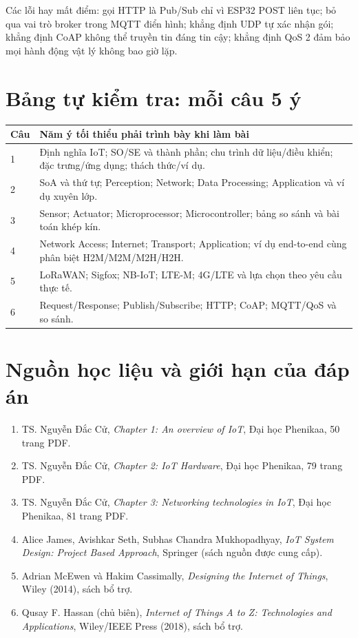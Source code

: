 \documentclass[12pt,a4paper]{article}
\begin{document}
\begin{luuy}
Các lỗi hay mất điểm: gọi HTTP là Pub/Sub chỉ vì ESP32 POST liên tục; bỏ qua vai trò broker trong MQTT điển hình; khẳng định UDP tự xác nhận gói; khẳng định CoAP không thể truyền tin đáng tin cậy; khẳng định QoS 2 đảm bảo mọi hành động vật lý không bao giờ lặp.
\end{luuy}

\newpage
\section*{Bảng tự kiểm tra: mỗi câu 5 ý}
\begin{longtable}{p{1.4cm}p{13.2cm}}
\toprule
Câu & Năm ý tối thiểu phải trình bày khi làm bài\\
\midrule\endhead
1 & Định nghĩa IoT; SO/SE và thành phần; chu trình dữ liệu/điều khiển; đặc trưng/ứng dụng; thách thức/ví dụ.\\
2 & SoA và thứ tự; Perception; Network; Data Processing; Application và ví dụ xuyên lớp.\\
3 & Sensor; Actuator; Microprocessor; Microcontroller; bảng so sánh và bài toán khép kín.\\
4 & Network Access; Internet; Transport; Application; ví dụ end-to-end cùng phân biệt H2M/M2M/M2H/H2H.\\
5 & LoRaWAN; Sigfox; NB-IoT; LTE-M; 4G/LTE và lựa chọn theo yêu cầu thực tế.\\
6 & Request/Response; Publish/Subscribe; HTTP; CoAP; MQTT/QoS và so sánh.\\
\bottomrule
\end{longtable}

\section*{Nguồn học liệu và giới hạn của đáp án}
\begin{enumerate}
\item TS. Nguyễn Đắc Cử, \emph{Chapter 1: An overview of IoT}, Đại học Phenikaa, 50 trang PDF.
\item TS. Nguyễn Đắc Cử, \emph{Chapter 2: IoT Hardware}, Đại học Phenikaa, 79 trang PDF.
\item TS. Nguyễn Đắc Cử, \emph{Chapter 3: Networking technologies in IoT}, Đại học Phenikaa, 81 trang PDF.
\item Alice James, Avishkar Seth, Subhas Chandra Mukhopadhyay, \emph{IoT System Design: Project Based Approach}, Springer (sách nguồn được cung cấp).
\item Adrian McEwen và Hakim Cassimally, \emph{Designing the Internet of Things}, Wiley (2014), sách bổ trợ.
\item Qusay F. Hassan (chủ biên), \emph{Internet of Things A to Z: Technologies and Applications}, Wiley/IEEE Press (2018), sách bổ trợ.
\end{enumerate}
\end{document}
